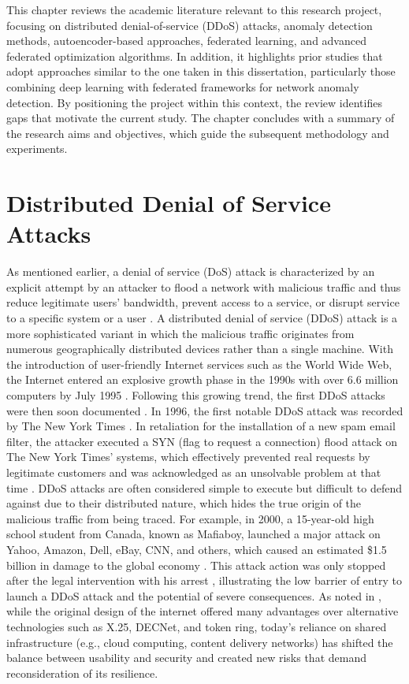 This chapter reviews the academic literature relevant to this research project, focusing on distributed denial-of-service (DDoS) attacks, anomaly detection methods, autoencoder-based approaches, federated learning, and advanced federated optimization algorithms. In addition, it highlights prior studies that adopt approaches similar to the one taken in this dissertation, particularly those combining deep learning with federated frameworks for network anomaly detection. By positioning the project within this context, the review identifies gaps that motivate the current study. The chapter concludes with a summary of the research aims and objectives, which guide the subsequent methodology and experiments.

\section{Distributed Denial of Service Attacks}

As mentioned earlier, a denial of service (DoS) attack is characterized by an explicit attempt by an attacker to flood a network with malicious traffic and thus reduce legitimate users' bandwidth, prevent access to a service, or disrupt service to a specific system or a user \citep{886455}. A distributed denial of service (DDoS) attack is a more sophisticated variant in which the malicious traffic originates from numerous geographically distributed devices rather than a single machine. With the introduction of user-friendly Internet services such as the World Wide Web, the Internet entered an explosive growth phase in the 1990s with over 6.6 million computers by July 1995 \citep{GLOWNIAK1998135}. Following this growing trend, the first DDoS attacks were then soon documented \citep{9404833}. In 1996, the first notable DDoS attack was recorded by The New York Times \citep{nyt-ddos}. In retaliation for the installation of a new spam email filter, the attacker executed a SYN (flag to request a connection) flood attack on The New York Times' systems, which effectively prevented real requests by legitimate customers and was acknowledged as an unsolvable problem at that time \citep{nyt-ddos}. DDoS attacks are often considered simple to execute but difficult to defend against due to their distributed nature, which hides the true origin of the malicious traffic from being traced. For example, in 2000, a 15-year-old high school student from Canada, known as Mafiaboy, launched a major attack on Yahoo, Amazon, Dell, eBay, CNN, and others, which caused an estimated \$1.5 billion in damage to the global economy \citep{9404833}. This attack action was only stopped after the legal intervention with his arrest \citep{mafiaboy}, illustrating the low barrier of entry to launch a DDoS attack and the potential of severe consequences. As noted in \cite{9404833}, while the original design of the internet offered many advantages over alternative technologies such as X.25, DECNet, and token ring, today’s reliance on shared infrastructure (e.g., cloud computing, content delivery networks) has shifted the balance between usability and security and created new risks that demand reconsideration of its resilience.

